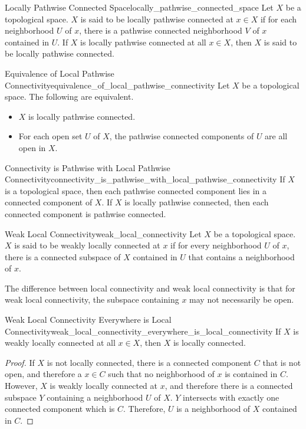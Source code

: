 \documentclass{article}
\begin{document}
\begin{definition}{Locally Pathwise Connected Space}{locally_pathwise_connected_space}
    Let $X$ be a topological space.
    $X$ is said to be locally pathwise connected at $x\in X$ if for each neighborhood $U$ of $x$, there is a pathwise connected neighborhood $V$ of $x$ contained in $U$.
    If $X$ is locally pathwise connected at all $x\in X$, then $X$ is said to be locally pathwise connected.
\end{definition}

\begin{theorem}{Equivalence of Local Pathwise Connectivity}{equivalence_of_local_pathwise_connectivity}
    Let $X$ be a topological space.
    The following are equivalent.
    \begin{itemize}
        \item $X$ is locally pathwise connected.
        \item For each open set $U$ of $X$, the pathwise connected components of $U$ are all open in $X$.
    \end{itemize}
\end{theorem}

\begin{theorem}{Connectivity is Pathwise with Local Pathwise Connectivity}{connectivity_is_pathwise_with_local_pathwise_connectivity}
    If $X$ is a topological space, then each pathwise connected component lies in a connected component of $X$.
    If $X$ is locally pathwise connected, then each connected component is pathwise connected.
\end{theorem}

\begin{definition}{Weak Local Connectivity}{weak_local_connectivity}
    Let $X$ be a topological space.
    $X$ is said to be weakly locally connected at $x$ if for every neighborhood $U$ of $x$, there is a connected subspace of $X$ contained in $U$ that contains a neighborhood of $x$.
\end{definition}

The difference between local connectivity and weak local connectivity is that for weak local connectivity, the subspace containing $x$ may not necessarily be open.

\begin{proposition}{Weak Local Connectivity Everywhere is Local Connectivity}{weak_local_connectivity_everywhere_is_local_connectivity}
    If $X$ is weakly locally connected at all $x\in X$, then $X$ is locally connected.
\end{proposition}
\begin{proof}
    If $X$ is not locally connected, there is a connected component $C$ that is not open, and therefore a $x\in C$ such that no neighborhood of $x$ is contained in $C$.
    However, $X$ is weakly locally connected at $x$, and therefore there is a connected subspace $Y$ containing a neighborhood $U$ of $X$.
    $Y$ intersects with exactly one connected component which is $C$.
    Therefore, $U$ is a neighborhood of $X$ contained in $C$.
\end{proof}
\end{document}
